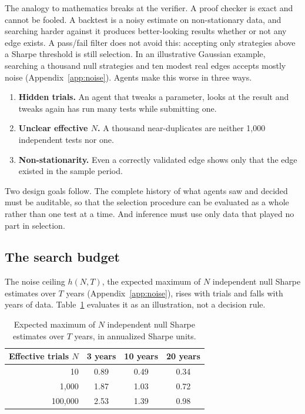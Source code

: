\documentclass[11pt]{article}
\begin{document}
The analogy to mathematics breaks at the verifier. A proof checker is exact and cannot be fooled. A backtest is a noisy estimate on non-stationary data, and searching harder against it produces better-looking results whether or not any edge exists. A pass/fail filter does not avoid this: accepting only strategies above a Sharpe threshold is still selection. In an illustrative Gaussian example, searching a thousand null strategies and ten modest real edges accepts mostly noise (Appendix~\ref{app:noise}). Agents make this worse in three ways.
\begin{enumerate}
  \item \textbf{Hidden trials.} An agent that tweaks a parameter, looks at the result and tweaks again has run many tests while submitting one.
  \item \textbf{Unclear effective $N$.} A thousand near-duplicates are neither 1{,}000 independent tests nor one.
  \item \textbf{Non-stationarity.} Even a correctly validated edge shows only that the edge existed in the sample period.
\end{enumerate}
Two design goals follow. The complete history of what agents saw and decided must be auditable, so that the selection procedure can be evaluated as a whole rather than one test at a time. And inference must use only data that played no part in selection.

\subsection{The search budget}\label{sec:budget}

The noise ceiling $h(N,T)$, the expected maximum of $N$ independent null Sharpe estimates over $T$ years (Appendix~\ref{app:noise}), rises with trials and falls with years of data. Table~\ref{tab:ceiling} evaluates it as an illustration, not a decision rule.

\begin{table}[ht]
\centering
\small
\begin{tabular}{@{}rccc@{}}
\toprule
Effective trials $N$ & 3 years & 10 years & 20 years \\
\midrule
10 & 0.89 & 0.49 & 0.34 \\
1{,}000 & 1.87 & 1.03 & 0.72 \\
100{,}000 & 2.53 & 1.39 & 0.98 \\
\bottomrule
\end{tabular}
\caption{Expected maximum of $N$ independent null Sharpe estimates over $T$ years, in annualized Sharpe units.}
\label{tab:ceiling}
\end{table}
\end{document}
